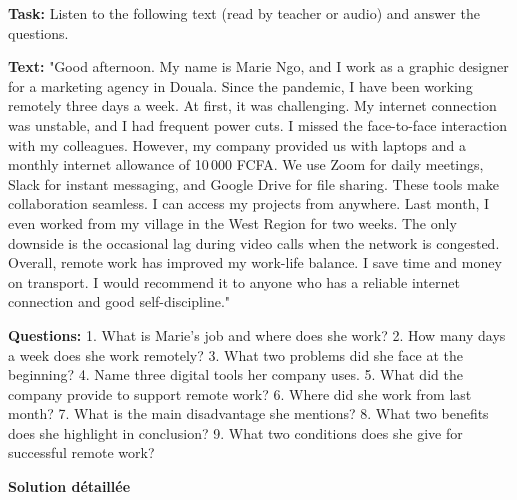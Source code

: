\documentclass[11pt]{article}
\begin{document}
\begin{exoresolu}
\textbf{Task:} Listen to the following text (read by teacher or audio) and answer the questions.

\textbf{Text:}
"Good afternoon. My name is Marie Ngo, and I work as a graphic designer for a marketing agency in Douala. Since the pandemic, I have been working remotely three days a week. At first, it was challenging. My internet connection was unstable, and I had frequent power cuts. I missed the face-to-face interaction with my colleagues. However, my company provided us with laptops and a monthly internet allowance of 10\,000 FCFA. We use Zoom for daily meetings, Slack for instant messaging, and Google Drive for file sharing. These tools make collaboration seamless. I can access my projects from anywhere. Last month, I even worked from my village in the West Region for two weeks. The only downside is the occasional lag during video calls when the network is congested. Overall, remote work has improved my work-life balance. I save time and money on transport. I would recommend it to anyone who has a reliable internet connection and good self-discipline."

\textbf{Questions:}
1. What is Marie's job and where does she work?
2. How many days a week does she work remotely?
3. What two problems did she face at the beginning?
4. Name three digital tools her company uses.
5. What did the company provide to support remote work?
6. Where did she work from last month?
7. What is the main disadvantage she mentions?
8. What two benefits does she highlight in conclusion?
9. What two conditions does she give for successful remote work?

\tcblower
\textbf{Solution détaillée}


\end{exoresolu}
\end{document}
